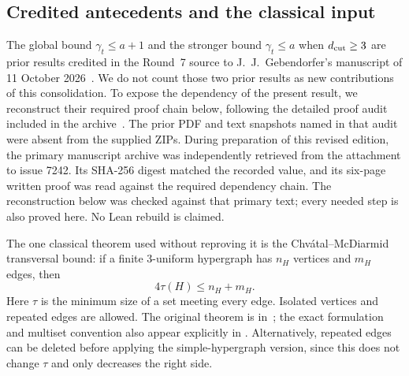 \documentclass[11pt,a4paper]{article}
\theoremstyle{definition}\newtheorem{definition}[theorem]{Definition}
\theoremstyle{remark}\newtheorem{remark}[theorem]{Remark}
\begin{document}
\subsection{Credited antecedents and the classical input}

The global bound $\gamma_t\leq a+1$ and the stronger bound
$\gamma_t\leq a$ when $d_{\rm cut}\geq3$ are prior results credited
in the Round~7 source to J.~J.~Gebendorfer's manuscript of
11 October 2026~\cite{early:gebendorfer}.  We do not count those two
prior results as new contributions of this consolidation.  To expose
the dependency of the present result, we reconstruct their required
proof chain below, following the detailed proof audit included in the
archive~\cite{early:298-audit}.  The prior PDF and text snapshots named in that audit were absent from
the supplied ZIPs. During preparation of this revised edition, the primary
manuscript archive was independently retrieved from the attachment to
issue 7242. Its SHA-256 digest matched the recorded value, and its six-page
written proof was read against the required dependency chain. The
reconstruction below was checked against that primary text; every needed
step is also proved here. No Lean rebuild is claimed.

The one classical theorem used without reproving it is the
Chv\'atal--McDiarmid transversal bound: if a finite 3-uniform
hypergraph has $n_H$ vertices and $m_H$ edges, then
\begin{equation}
 4\tau(H)\leq n_H+m_H.
 \label{early:eq:cm}
\end{equation}
Here $\tau$ is the minimum size of a set meeting every edge.
Isolated vertices and repeated edges are allowed.  The original
theorem is in~\cite{early:chvatal-mcdiarmid}; the exact formulation
and multiset convention also appear explicitly in
\cite{early:henning-lowenstein}.  Alternatively, repeated edges
can be deleted before applying the simple-hypergraph version, since
this does not change $\tau$ and only decreases the right side.
\end{document}
